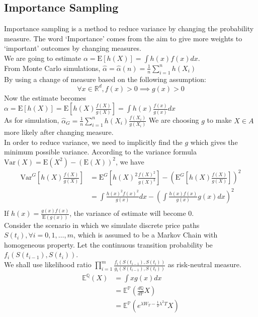 \subsection*{Importance Sampling}
Importance sampling is a method to reduce variance by changing the probability measure. The word `Importance' comes from the aim to give more weights to `important' outcomes by changing measures.\\
We are going to estimate $\displaystyle \alpha = \mathrm{E}[h(X)] = \int h(x)f(x) dx$.\\
From Monte Carlo simulations, $\displaystyle \hat{\alpha} = \hat{\alpha}(n) = \frac{1}{n} \sum_{i=1}^{n} h(X_{i})$\\
By using a change of measure based on the following assumption:
$$\forall x \in \mathbb{R}^{d}, f(x) > 0 \implies g(x) > 0$$
Now the estimate becomes $\displaystyle \alpha = \mathrm{E}[h(X)] = \mathrm{E}[h(X)\frac{f(X)}{g(X)}] = \int h(x)\frac{f(x)}{g(x)} dx$\\
As for simulation, $\displaystyle \hat{\alpha}_{G} = \frac{1}{n} \sum_{i=1}^{n} h(X_{i})\frac{f(X_{i})}{g(X_{i})}$
We are choosing $g$ to make ${X \in A}$ more likely after changing measure.\\
In order to reduce variance, we need to implicitly find the $g$ which gives the minimum possible variance. According to the variance formula $\mathrm{Var}(X) = \mathrm{E}(X^{2}) - (\mathrm{E}(X))^{2} $, we have
\begin{equation*}
\begin{split}
\mathrm{Var}^{G}[h(X)\frac{f(X)}{g(X)}] &= \mathrm{E}^{G}[h(X)^{2}\frac{f(X)^{2}}{g(X)^{2}}] - (\mathrm{E}^{G}[h(X)\frac{f(X)}{g(X)}])^{2}\\
&= \int \frac{h(x)^{2}f(x)^{2}}{g(x)} dx - (\int \frac{h(x)f(x)}{g(x)}g(x) dx)^{2}\\
\end{split}
\end{equation*}
If $\displaystyle h(x) = \frac{g(x)f(x)}{\mathrm{E}(g(x))}$, the variance of estimate will become 0.\\
Consider the scenario in which we simulate discrete price paths $S(t_{i}), \forall i = 0, 1, \dots, m$, which is assumed to be a Markov Chain with homogeneous property. Let the continuous transition probability be $f_{i}(S(t_{i-1}),S(t_{i}))$.\\[3mm]
We shall use likelihood ratio $\displaystyle \prod_{i=1}^{m} \frac{f_{i}(S(t_{i-1}),S(t_{i}))}{g_{i}(S(t_{i-1}),S(t_{i}))}$ as risk-neutral measure.
\begin{equation*}
\begin{split}
\mathbb{E}^{\mathbb{Q}}(X) 
&= \int x g(x) dx\\
&= \mathbb{E}^{\mathbb{P}}(\frac{d\mathbb{Q}}{d\mathbb{P}}X) \\
&= \mathbb{E}^{\mathbb{P}}(e^{\lambda W_{T} - \frac{1}{2}\lambda^{2}T}X) \\[7mm]
\end{split}
\end{equation*}
